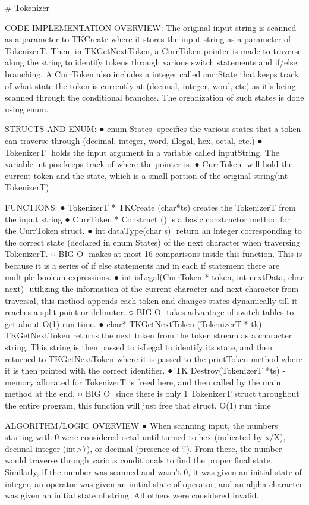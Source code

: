 # Tokenizer

CODE IMPLEMENTATION OVERVIEW:
The original input string is scanned as a parameter to TKCreate where it stores the input string as a parameter of TokenizerT. Then, in TKGetNextToken, a CurrToken pointer is made to traverse along the string to identify tokens through various switch statements and if/else branching. A CurrToken also includes a integer called currState that keeps track of what state the token is currently at (decimal, integer, word, etc) as it’s being scanned through the conditional branches. The organization of such states is done using enum.

STRUCTS AND ENUM:
● enum States ­ specifies the various states that a token can traverse through (decimal, integer,
word, illegal, hex, octal, etc.)
● TokenizerT ­ holds the input argument in a variable called inputString. The variable int pos
keeps track of where the pointer is.
● CurrToken ­ will hold the current token and the state, which is a small portion of the original
string(int TokenizerT)

FUNCTIONS:
● TokenizerT * TKCreate (char*ts)­ creates the TokenizerT from the input string
● CurrToken * Construct ()­ is a basic constructor method for the CurrToken struct.
● int dataType(char s) ­ return an integer corresponding to the correct state (declared in enum
States) of the next character when traversing TokenizerT.
○ BIG O ­ makes at most 16 comparisons inside this function. This is because it is a series
of if else statements and in each if statement there are multiple boolean expressions. ● int isLegal(CurrToken * token, int nextData, char next) ­ utilizing the information of the
current character and next character from traversal, this method appends each token and changes states dynamically till it reaches a split point or delimiter.
○ BIG O ­ takes advantage of switch tables to get about O(1) run time.
● char* TKGetNextToken (TokenizerT * tk) ­ TKGetNextToken returns the next token from the
token stream as a character string. This string is then passed to isLegal to identify its state, and then returned to TKGetNextToken where it is passed to the printToken method where it is then printed with the correct identifier.
● TK Destroy(TokenizerT *ts) ­ memory allocated for TokenizerT is freed here, and then called by the main method at the end.
○ BIG O ­ since there is only 1 TokenizerT struct throughout the entire program, this function will just free that struct. O(1) run time

ALGORITHM/LOGIC OVERVIEW
● When scanning input, the numbers starting with 0 were considered octal until turned to hex
(indicated by x/X), decimal integer (int>7), or decimal (presence of ‘.’). From there, the number would traverse through various conditionals to find the proper final state. Similarly, if the number was scanned and wasn’t 0, it was given an initial state of integer, an operator was given an initial
 state of operator, and an alpha character was given an initial state of string. All others were
considered invalid.

